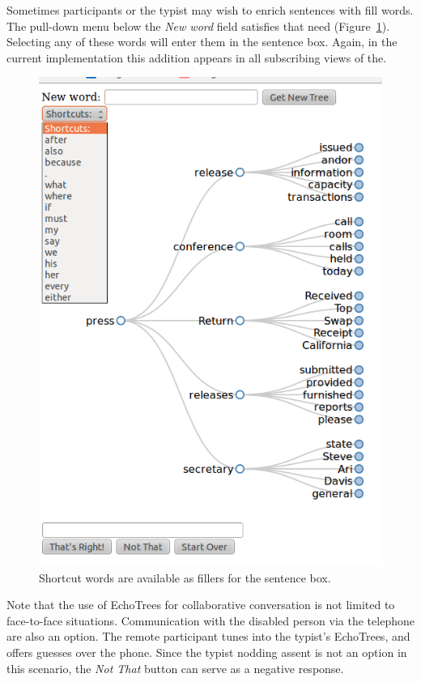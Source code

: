 \documentclass{sigchi}
\begin{document}
Sometimes participants or the typist may wish to enrich sentences with
fill words. The pull-down menu below the {\em New word} field
satisfies that need (Figure~\ref{fig:shortcuts}). Selecting any of
these words will enter them in the sentence box. Again, in the current
implementation this addition appears in all subscribing views of the.
\begin{figure}
   \centering
   \includegraphics[width=\columnwidth]{Figs/echoTreePulldownSnapshotSmall.png}
   \caption{Shortcut words are available as fillers for the sentence box.}
   \label{fig:shortcuts}
\end{figure}
Note that the use of EchoTrees for collaborative conversation is not
limited to face-to-face situations. Communication with the disabled
person via the telephone are also an option. The remote participant
tunes into the typist's EchoTrees, and offers guesses over the
phone. Since the typist nodding assent is not an option in this
scenario, the {\em Not That} button can serve as a negative response.
\end{document}
